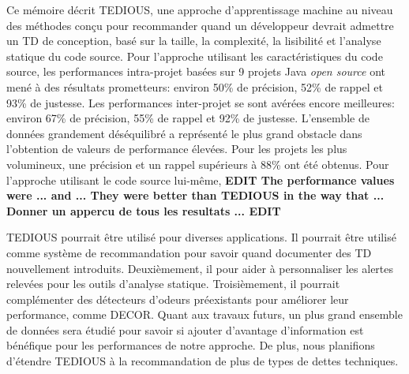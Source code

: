 Ce m\'{e}moire d\'{e}crit \ac{TEDIOUS}, une approche d'apprentissage machine au niveau des m\'{e}thodes con\c{c}u pour recommander quand un d\'{e}veloppeur devrait admettre un \ac{TD} de conception, bas\'{e} sur la taille, la complexit\'{e}, la lisibilit\'{e} et l'analyse statique du code source. Pour l'approche utilisant les caract\'{e}ristiques du code source, les performances intra-projet bas\'{e}es sur 9 projets Java \emph{open source} ont men\'{e} \`{a} des r\'{e}sultats prometteurs: environ 50\% de pr\'{e}cision, 52\% de rappel et 93\% de justesse. Les performances inter-projet se sont av\'{e}r\'{e}es encore meilleures: environ 67\% de pr\'{e}cision, 55\% de rappel et 92\% de justesse. L'ensemble de donn\'{e}es grandement d\'{e}s\'{e}quilibr\'{e} a repr\'{e}sent\'{e} le plus grand obstacle dans l'obtention de valeurs de performance \'{e}lev\'{e}es. Pour les projets les plus volumineux, une pr\'{e}cision et un rappel sup\'{e}rieurs \`{a} 88\% ont \'{e}t\'{e} obtenus. Pour l'approche utilisant le code source lui-m\^{e}me, \textbf{EDIT The performance values were ... and ... They were better than \ac{TEDIOUS} in the way that ... Donner un appercu de tous les resultats ... EDIT} \par

\ac{TEDIOUS} pourrait \^{e}tre utilis\'{e} pour diverses applications. Il pourrait \^{e}tre utilis\'{e} comme syst\`{e}me de recommandation pour savoir quand documenter des \ac{TD} nouvellement introduits. Deuxi\`{e}mement, il pour aider \`{a} personnaliser les alertes relev\'{e}es pour les outils d'analyse statique. Troisi\`{e}mement, il pourrait compl\'{e}menter des d\'{e}tecteurs d'odeurs pr\'{e}existants pour am\'{e}liorer leur performance, comme \ac{DECOR}. Quant aux travaux futurs, un plus grand ensemble de donn\'{e}es sera \'{e}tudi\'{e} pour savoir si ajouter d'avantage d'information est b\'{e}n\'{e}fique pour les performances de notre approche. De plus, nous planifions d'\'{e}tendre \ac{TEDIOUS} \`{a} la recommandation de plus de types de dettes techniques.























